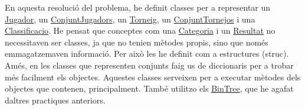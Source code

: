 En aquesta resolució del problema, he definit classes per a representar un \mbox{\hyperlink{class_jugador}{Jugador}}, un \mbox{\hyperlink{class_conjunt_jugadors}{Conjunt\+Jugadors}}, un \mbox{\hyperlink{class_torneig}{Torneig}}, un \mbox{\hyperlink{class_conjunt_tornejos}{Conjunt\+Tornejos}} i una \mbox{\hyperlink{class_classificacio}{Classificacio}}. He pensat que conceptes com una \mbox{\hyperlink{struct_categoria}{Categoria}} i un \mbox{\hyperlink{struct_resultat}{Resultat}} no necessitaven ser classes, ja que no tenien mètodes propis, sino que només emmagatzemaven informació. Per això les he definit com a estructures (struc). A\textquotesingle{}més, en les classes que representen conjunts faig us de diccionaris per a trobar més facilment els objectes. Aquestes classes serveixen per a executar mètodes dels objectes que contenen, principalment. També utilitzo els \mbox{\hyperlink{class_bin_tree}{Bin\+Tree}}, que he agafat d\textquotesingle{}altres practiques anteriors. 